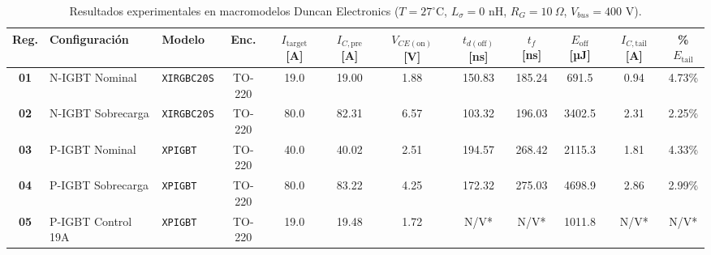 \documentclass[11pt,a4paper]{article}
\begin{document}
\begin{landscape}
\begin{table}[htbp]
\centering
\small
\setlength{\tabcolsep}{5.5pt}
\caption{Resultados experimentales en macromodelos Duncan Electronics ($T = 27^\circ\text{C}$, $L_\sigma = 0\text{ nH}$, $R_G = 10\ \Omega$, $V_{bus} = 400\text{ V}$).}
\label{tab:duncan}
\begin{tabular}{@{}c l l c c c c c c c c c@{}}
\toprule
\textbf{Reg.} & \textbf{Configuración} & \textbf{Modelo} & \textbf{Enc.} & $I_{\text{target}}$ [A] & $I_{C,\text{pre}}$ [A] & $V_{CE(\text{on})}$ [V] & $t_{d(\text{off})}$ [ns] & $t_f$ [ns] & $E_{\text{off}}$ [µJ] & $I_{C,\text{tail}}$ [A] & \textbf{\%}$E_{\text{tail}}$ \\
\midrule
\textbf{01} & N-IGBT Nominal & \texttt{XIRGBC20S} & TO-220 & 19.0 & 19.00 & 1.88 & 150.83 & 185.24 & 691.5 & 0.94 & 4.73\% \\
\textbf{02} & N-IGBT Sobrecarga & \texttt{XIRGBC20S} & TO-220 & 80.0 & 82.31 & 6.57 & 103.32 & 196.03 & 3402.5 & 2.31 & 2.25\% \\
\textbf{03} & P-IGBT Nominal & \texttt{XPIGBT} & TO-220 & 40.0 & 40.02 & 2.51 & 194.57 & 268.42 & 2115.3 & 1.81 & 4.33\% \\
\textbf{04} & P-IGBT Sobrecarga & \texttt{XPIGBT} & TO-220 & 80.0 & 83.22 & 4.25 & 172.32 & 275.03 & 4698.9 & 2.86 & 2.99\% \\
\textbf{05} & P-IGBT Control 19A & \texttt{XPIGBT} & TO-220 & 19.0 & 19.48 & 1.72 & N/V* & N/V* & 1011.8 & N/V* & N/V* \\
\bottomrule
\end{tabular}
\end{table}

\vspace{0.12cm}
\\[3pt]


\end{landscape}
\end{document}
